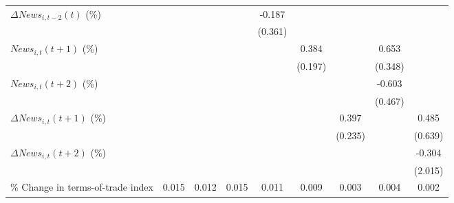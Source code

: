 {\begin{tabular}{l*{8}{c}}
\addlinespace
$ \Delta News_{i,t-2}(t)$ (\%)&                     &                     &                     &      -0.187         &                     &                     &                     &                     \\
                    &                     &                     &                     &     (0.361)         &                     &                     &                     &                     \\
\addlinespace
$ News_{i,t}(t+1)$ (\%)&                     &                     &                     &                     &       0.384\sym{*}  &                     &       0.653\sym{*}  &                     \\
                    &                     &                     &                     &                     &     (0.197)         &                     &     (0.348)         &                     \\
\addlinespace
$ News_{i,t}(t+2)$ (\%)&                     &                     &                     &                     &                     &                     &      -0.603         &                     \\
                    &                     &                     &                     &                     &                     &                     &     (0.467)         &                     \\
\addlinespace
$ \Delta News_{i,t}(t+1)$ (\%)&                     &                     &                     &                     &                     &       0.397\sym{*}  &                     &       0.485         \\
                    &                     &                     &                     &                     &                     &     (0.235)         &                     &     (0.639)         \\
\addlinespace
$ \Delta News_{i,t}(t+2)$ (\%)&                     &                     &                     &                     &                     &                     &                     &      -0.304         \\
                    &                     &                     &                     &                     &                     &                     &                     &     (2.015)         \\
\addlinespace
\% Change in terms-of-trade index&       0.015         &       0.012         &       0.015         &       0.011         &       0.009         &       0.003         &       0.004         &       0.002         \\

\end{tabular}}
